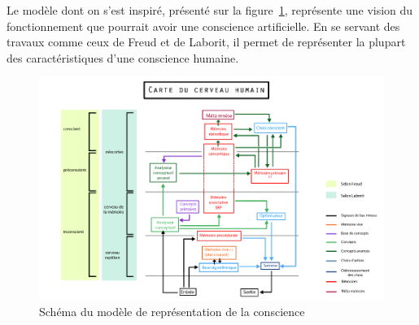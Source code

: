 Le modèle dont on s'est inspiré, présenté sur la figure~\ref{modele_original},
représente une vision du fonctionnement que pourrait avoir une conscience
artificielle. En se servant des travaux comme ceux de Freud et de Laborit, il permet de représenter la plupart des caractéristiques
d’une conscience humaine. 
\begin{figure}[H] 
\centering
\includegraphics[width=\textwidth]{files/modele_original} 
\caption{Schéma du modèle de représentation de la conscience} 
\label{modele_original}
\end{figure}